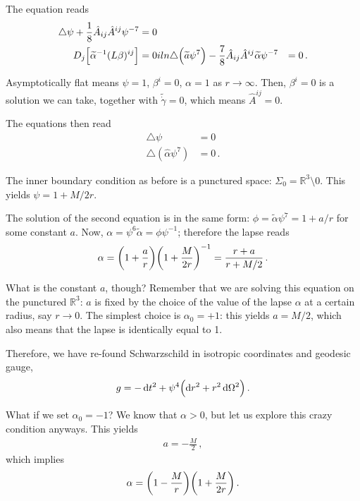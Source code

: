 \documentclass[main.tex]{subfiles}
\begin{document}
The equation reads 
%
\begin{align}
\triangle \psi + \frac{1}{8} \hat{A}_{ij} \hat{A}^{ij} \psi^{-7} &= 0  \\
D_j \qty[\widetilde{\alpha }^{-1} (L \beta )^{ij} ] &= 0 iln
\triangle \qty(\widetilde{a} \psi^{7}) - \frac{7}{8} \hat{A}_{ij} \hat{A}^{ij} \widetilde{\alpha} \psi^{-7} &= 0
\,.
\end{align}

Asymptotically flat means \(\psi = 1\), \(\beta^{i} = 0\), \(\alpha = 1\) as \(r \to \infty \). 
Then, \(\beta^{i} = 0\) is a solution we can take, together with \(\widetilde{\dot{\gamma}} = 0\), which means \(\hat{A}^{ij} = 0\). 

The equations then read 
%
\begin{align}
\triangle \psi &= 0  \\
\triangle (\hat{\alpha} \psi^{7}) &= 0
\,. 
\end{align}

The inner boundary condition as before is a punctured space: \(\Sigma_0 = \mathbb{R}^3 \setminus 0\). 
This yields \(\psi = 1 + M / 2r\). 

The solution of the second equation is in the same form: \(\phi = \widetilde{\alpha} \psi^{7} = 1 + a / r\) for some constant \(a\). 
Now, \(\alpha = \psi^{6} \widetilde{\alpha} = \phi \psi^{-1}\); therefore the lapse reads 
%
\begin{align}
\alpha = \qty(1 + \frac{a}{r}) \qty(1 + \frac{M}{2r})^{-1} 
= \frac{r + a}{r + M/2}
\,.
\end{align}

What is the constant \(a\), though? Remember that we are solving this equation on the punctured \(\mathbb{R}^3\): \(a\) is fixed by the choice of the value of the lapse \(\alpha \) at a certain radius, say \(r \to 0\). 
The simplest choice is \(\alpha_0 = +1\): this yields \(a = M/2\), which also means that the lapse is identically equal to 1. 

Therefore, we have re-found Schwarzschild in isotropic coordinates and geodesic gauge, 
%
\begin{align}
g = - \dd{t^2} + \psi^{4} \qty(\dd{r^2} + r^2 \dd{\Omega^2})
\,.
\end{align}

What if we set \(\alpha_0 = -1\)? We know that \(\alpha > 0\), but let us explore this crazy condition anyways. 
This yields 
%
\begin{align}
a = - \frac{M}{2}
\,,
\end{align}
%
which implies 
%
\begin{align}
\alpha = \qty(1 - \frac{M}{r}) \qty(1 + \frac{M}{2r})
\,.
\end{align}
\end{document}
